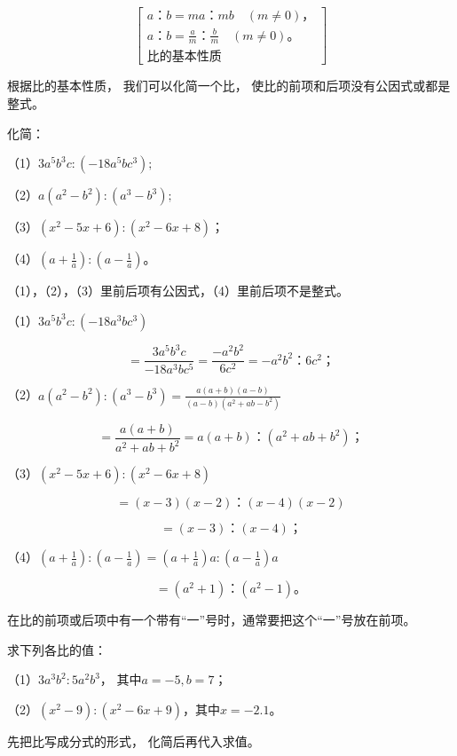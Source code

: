 \[
\left[ \begin{array}{l} a\text{：} b = m a\text{：} m b \quad (m \neq 0)\text{，} \\ a\text{：} b = \frac{a}{m}\text{：} \frac{b}{m} \quad (m \neq 0)\text{。} \\ \text{比的基本性质} \end{array} \right]
\]

根据比的基本性质， 我们可以化简一个比，
使比的前项和后项没有公因式或都是整式。

 化简：

（1）\(3a^{5}b^{3}c:(-18a^{5}b c^{3});\)

（2）\(a(a^{2} - b^{2}):(a^{3} - b^{3});\)

（3）\((x^{2} - 5x + 6):(x^{2} - 6x + 8)\)；

（4）\(\left(a + \frac{1}{a}\right):\left(a - \frac{1}{a}\right)\)。

（1），（2），（3）里前后项有公因式，（4）里前后项不是整式。

 （1）\(3a^{5}b^{3}c:(-18a^{3}b c^{3})\)

\[
= \frac{3 a ^{5} b ^{3} c}{- 18 a ^{3} b c ^{5}} = \frac{- a ^{2} b ^{2}}{6 c ^{2}} = - a ^{2} b ^{2}\text{：} 6 c ^{2}\text{；}
\]

（2）\(a(a^2 - b^2): (a^3 - b^3) = \frac{a(a + b)(a - b)}{(a - b)(a^2 + ab - b^2)}\)

\[
= \frac{a (a + b)}{a ^{2} + a b + b ^{2}} = a (a + b)\text{：} (a ^{2} + a b + b ^{2})\text{；}
\]

（3）\((x^{2} - 5x + 6):(x^{2} - 6x + 8)\)

\[
= (x - 3) (x - 2)\text{：} (x - 4) (x - 2)
\]

\[
= (x - 3)\text{：} (x - 4)\text{；}
\]

（4）\(\left(a + \frac{1}{a}\right):\left(a - \frac{1}{a}\right) = \left(a + \frac{1}{a}\right)a:\left(a - \frac{1}{a}\right)a\)

\[
= (a ^{2} + 1)\text{：} (a ^{2} - 1)\text{。}
\]

在比的前项或后项中有一个带有``一''号时，通常要把这个``一''号放在前项。

 求下列各比的值：

（1）\(3a^{3}b^{2}:5a^{2}b^{3}\)， 其中\(a = -5, b = 7\)；

（2）\((x^{2} - 9):(x^{2} - 6x + 9)\)，其中\(x = -2.1\)。

 先把比写成分式的形式， 化简后再代入求值。

